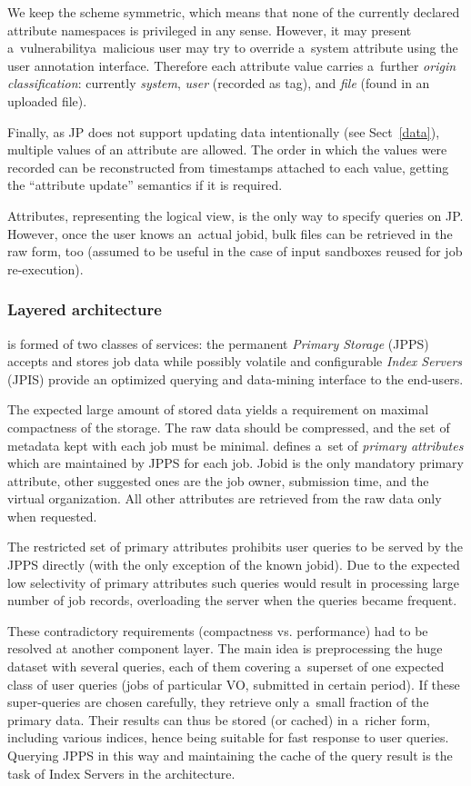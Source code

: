We keep the scheme symmetric, which means that none of the currently declared attribute
namespaces is privileged in any sense.
However, it may present a~vulnerability\Dash a~malicious user may try 
to override a~\JP system attribute using the user annotation interface.
Therefore each attribute value carries a~further \emph{origin classification}:
currently \emph{system}, \emph{user} (recorded as tag), and
\emph{file} (found in an uploaded file).

Finally, as JP does not support updating data intentionally
(see Sect~\ref{data}), multiple values of an attribute are allowed.
The order in which the values were recorded can be reconstructed from
timestamps attached to each value, getting the ``attribute update'' semantics
if it is required.

Attributes, representing the logical view, is the only way to specify queries on JP.
However, once the user knows an~actual jobid, bulk files can be retrieved
in the raw form, too (assumed to be useful in the case of input sandboxes
reused for job re-execution).

\subsubsection{Layered architecture}%
\label{layered}
\JP is formed of two classes of services: the permanent \emph{Primary Storage}
(JPPS) accepts and stores job data
while possibly volatile and configurable \emph{Index Servers} (JPIS)
provide an optimized querying and data-mining interface to the end-users.

The expected large amount of stored data yields a requirement on
maximal compactness of the storage.
The raw data should be compressed,
and the set of metadata kept with each job must be minimal.
\JP defines a~set of \emph{primary attributes} which are maintained
by JPPS for each job.
Jobid is the only mandatory primary attribute,
other suggested ones are the job owner, submission time,
and the virtual organization.
All other attributes are retrieved from the raw data only when requested.

The restricted set of primary attributes prohibits user queries to be served
by the JPPS directly (with the only exception of the known jobid).
Due to the expected low selectivity of primary attributes such queries
would result in processing large number of job records, overloading
the server when the queries became frequent.

These contradictory requirements (compactness vs. performance) had to be
resolved at another component layer.
The main idea is preprocessing the huge \JP dataset with several queries,
each of them covering a~superset of one expected class of user queries
(\eg jobs of particular VO, submitted in certain period).
If these super-queries are chosen carefully, they retrieve only a~small
fraction of the primary data. Their results can thus be stored (or cached)
in a~richer form, including various indices, hence being suitable
for fast response to user queries.
Querying JPPS in this way and maintaining the cache of the query result
is the task of Index Servers in the \JP architecture.

